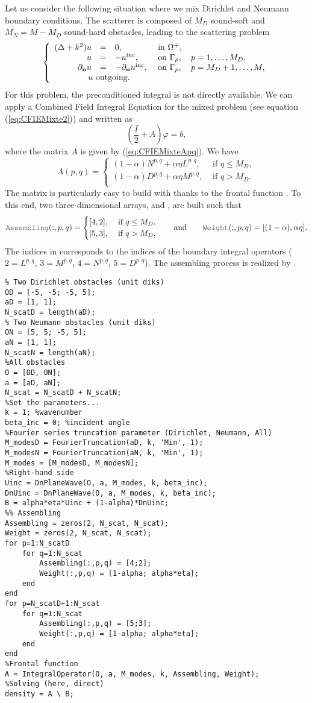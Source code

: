 Let us consider the following situation where we mix Dirichlet and Neumann boundary conditions. The scatterer is composed of
 $M_D$ sound-soft and  $M_N = M-M_D$ sound-hard obstacles, leading to the scattering problem
$$
\left\{\begin{array}{r c l l}
(\Delta +k^2)u & = & 0, & \text{ in }\Omegaps,\\
u & = & -\uinc, & \text{ on }\Gamma_p,\quad p=1,\ldots, M_D,\\
\dn u & = & -\dn \uinc, & \text{ on }\Gamma_p,\quad p=M_D+1,\ldots, M,\\
\multicolumn{4}{l}{\qquad \qquad u \text{ outgoing}.}
\end{array}\right.
$$
For this problem, the  preconditioned integral is not directly available. We can apply a Combined Field Integral Equation for the mixed problem
 (see equation (\ref{eq:CFIEMixte2})) and written as $$(\frac{I}{2} +A)\varphi = b,$$ where
  the matrix $A$ is
  given by  (\ref{eq:CFIEMixteApq}). We have
$$
A(p,q) = 
\begin{cases}
(1-\alpha) N^{p,q} + \alpha\eta L^{p,q}, & \text{ if } q \leq M_D,\\
(1-\alpha) D^{p,q} + \alpha\eta M^{p,q}, & \text{ if } q > M_D.\\
\end{cases}
$$
The  matrix is particularly easy to build  with \mudiff thanks to the frontal function \IntegralOperator. To this end, two
 three-dimensional arrays,  and , are built such that
$$
\code{Assembling}(:, p,q) = 
\begin{cases}
[4,2], & \text{ if } q \leq M_D,\\
[5,3], & \text{ if } q > M_D,
\end{cases}\qquad\text{and}\qquad
\code{Weight}(:, p,q) = [(1-\alpha), \alpha\eta].
$$
The indices in  corresponds to the indices of the boundary integral operators ($2=L^{p,q}$, $3=M^{p,q}$, $4=N^{p,q}$, $5=D^{p,q}$). The assembling process is realized by \IntegralOperator.
\begin{lstlisting}
% Two Dirichlet obstacles (unit diks)
OD = [-5, -5; -5, 5];
aD = [1, 1];
N_scatD = length(aD);
% Two Neumann obstacles (unit diks)
ON = [5, 5; -5, 5];
aN = [1, 1];
N_scatN = length(aN);
%All obstacles
O = [OD, ON];
a = [aD, aN];
N_scat = N_scatD + N_scatN;
%Set the parameters...
k = 1; %wavenumber
beta_inc = 0; %incident angle
%Fourier series truncation parameter (Dirichlet, Neumann, All)
M_modesD = FourierTruncation(aD, k, 'Min', 1);
M_modesN = FourierTruncation(aN, k, 'Min', 1);
M_modes = [M_modesD, M_modesN];
%Right-hand side
Uinc = DnPlaneWave(O, a, M_modes, k, beta_inc);
DnUinc = DnPlaneWave(O, a, M_modes, k, beta_inc);
B = alpha*eta*Uinc + (1-alpha)*DnUinc;
%% Assembling
Assembling = zeros(2, N_scat, N_scat);
Weight = zeros(2, N_scat, N_scat);
for p=1:N_scatD
	for q=1:N_scat
		Assembling(:,p,q) = [4;2];
		Weight(:,p,q) = [1-alpha; alpha*eta];
	end
end
for p=N_scatD+1:N_scat
	for q=1:N_scat
		Assembling(:,p,q) = [5;3];
		Weight(:,p,q) = [1-alpha; alpha*eta];
	end
end
%Frontal function
A = IntegralOperator(O, a, M_modes, k, Assembling, Weight);
%Solving (here, direct)
density = A \ B;
\end{lstlisting}
\medskip

